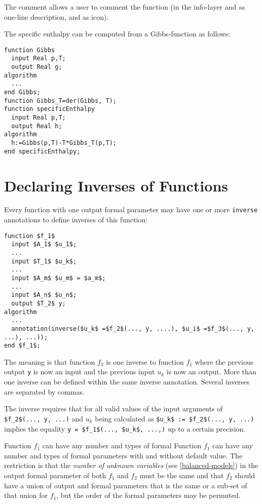 The comment allows a user to comment the function (in the info-layer and
as one-line description, and as icon).

\begin{example}
The specific enthalpy can be computed from a Gibbs-function as follows:
\begin{lstlisting}[language=modelica]
function Gibbs
  input Real p,T;
  output Real g;
algorithm
  ...
end Gibbs;
function Gibbs_T=der(Gibbs, T);
function specificEnthalpy
  input Real p,T;
  output Real h;
algorithm
  h:=Gibbs(p,T)-T*Gibbs_T(p,T);
end specificEnthalpy;
\end{lstlisting}
\end{example}

\section{Declaring Inverses of Functions}\label{declaring-inverses-of-functions}

Every function with one output formal parameter may have one or more
\lstinline!inverse! annotations to define inverses of this function:
\begin{lstlisting}[language=modelica]
function $f_1$
  input $A_1$ $u_1$;
  ...
  input $T_1$ $u_k$;
  ...
  input $A_m$ $u_m$ = $a_m$;
  ...
  input $A_n$ $u_n$;
  output $T_2$ y;
algorithm
  ...
  annotation(inverse($u_k$ =$f_2$(..., y, ....), $u_i$ =$f_3$(..., y, ...), ...));
end $f_1$;
\end{lstlisting}

The meaning is that function $f_2$ is one inverse to
function $f_1$ where the previous output \lstinline!y! is now an
input and the previous input $u_k$ is now an output. More
than one inverse can be defined within the same inverse annotation.
Several inverses are separated by commas.

\begin{nonnormative}
The inverse requires that for all valid values of the input arguments of \lstinline!$f_2$(..., y, ...)! and $u_k$ being calculated as \lstinline!$u_k$ := $f_2$(..., y, ...)! implies
the equality \lstinline!y = $f_1$(..., $u_k$, ...,)! up to a certain precision.
\end{nonnormative}

Function $f_1$ can have any number and types of formal
Function $f_1$ can have any number and types of formal
parameters with and without default value. The restriction is that the
\emph{number of unknown variables} (see \cref{balanced-models}) in the output formal
parameter of both $f_1$ and $f_2$ must be
the same and that $f_2$ should have a union of output and formal
parameters that is the same or a sub-set of that union for $f_1$, but the order of the formal
parameters may be permuted.


